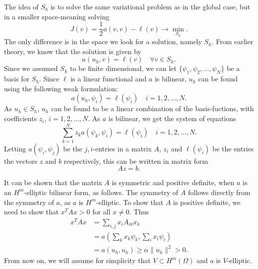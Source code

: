 The idea of $S_h$ is to solve the same variational problem as in the global case, 
but in a smaller space-meaning solving
\begin{equation*}
    J(v) = \frac{1}{2}a(v,v) - \ell(v) \to \underset{S_h}{\min}.
\end{equation*}
The only difference is in the space we look for a solution, namely $S_h$. From 
earlier theory, we know that the solution is given by 
\begin{equation*}
    a(u_h,v) = \ell(v) \quad \forall v \in S_h.
\end{equation*}
Since we assumed $S_h$ to be finite dimensional, we can let $ \{ \psi_1, \psi_2, \ldots, \psi_N \}$ 
be a basis for $S_h$. Since $\ell$ is a linear functional and $a$ is bilinear, 
$u_h$ can be found using the following weak formulation:
\begin{equation*}
    a(u_h, \psi_i) = \ell(\psi_i) \quad i = 1, 2, \ldots, N.
\end{equation*}
As $u_h \in S_h$, $u_h$ can be found to be a linear combination of the basis-fuctions, with 
coefficients $z_i$, $i=1, 2, \ldots, N$. As $a$ is bilinear, we get the system of 
equations
\begin{equation*}
    \sum_{k=1}^N z_k a(\psi_k,\psi_i) = \ell(\psi_i) \quad i = 1,2,\ldots,N.
\end{equation*}
Letting $a(\psi_i,\psi_j)$ be the $j,i$-entries in a matrix $A$, $z_i$ and $\ell(\psi_i)$ 
be the entries the vectors $z$ and $b$ respectively, this can be written in matrix form 
\begin{equation*}
    Az = b.
\end{equation*}

It can be shown that the matrix $A$ is symmetric and positive definite, when $a$ is an $H^m$-elliptic bilinear form, as follows. 
The symmetry of $A$ follows directly from the symmetry of $a$, as $a$ is $H^m$-elliptic.
To show that $A$ is positive definite, we need to show that $x^T Ax > 0$ for all $x \neq 0$. Thus
\begin{align*}
    x^T Ax &= \sum_{i,j} x_i A_{ik}x_k \\
    &= a\left(\sum_{k} x_k\psi_k,\sum_{i} x_i\psi_i\right) \\
    &= a(u_h,u_h) \geq \alpha \|u_h\|^2 > 0.
\end{align*}
From now on, we will assume for simplicity that $V\subset H^m(\Omega)$ and $a$ is $V$-elliptic. %